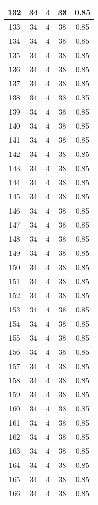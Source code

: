 \documentclass[letterpaper, 12pt]{article}
\begin{document}
\begin{longtable}{|c|c|c|c|c|}
\hline
132 & 34 & 4 & 38 & 0.85 \\
\hline
133 & 34 & 4 & 38 & 0.85 \\
\hline
134 & 34 & 4 & 38 & 0.85 \\
\hline
135 & 34 & 4 & 38 & 0.85 \\
\hline
136 & 34 & 4 & 38 & 0.85 \\
\hline
137 & 34 & 4 & 38 & 0.85 \\
\hline
138 & 34 & 4 & 38 & 0.85 \\
\hline
139 & 34 & 4 & 38 & 0.85 \\
\hline
140 & 34 & 4 & 38 & 0.85 \\
\hline
141 & 34 & 4 & 38 & 0.85 \\
\hline
142 & 34 & 4 & 38 & 0.85 \\
\hline
143 & 34 & 4 & 38 & 0.85 \\
\hline
144 & 34 & 4 & 38 & 0.85 \\
\hline
145 & 34 & 4 & 38 & 0.85 \\
\hline
146 & 34 & 4 & 38 & 0.85 \\
\hline
147 & 34 & 4 & 38 & 0.85 \\
\hline
148 & 34 & 4 & 38 & 0.85 \\
\hline
149 & 34 & 4 & 38 & 0.85 \\
\hline
150 & 34 & 4 & 38 & 0.85 \\
\hline
151 & 34 & 4 & 38 & 0.85 \\
\hline
152 & 34 & 4 & 38 & 0.85 \\
\hline
153 & 34 & 4 & 38 & 0.85 \\
\hline
154 & 34 & 4 & 38 & 0.85 \\
\hline
155 & 34 & 4 & 38 & 0.85 \\
\hline
156 & 34 & 4 & 38 & 0.85 \\
\hline
157 & 34 & 4 & 38 & 0.85 \\
\hline
158 & 34 & 4 & 38 & 0.85 \\
\hline
159 & 34 & 4 & 38 & 0.85 \\
\hline
160 & 34 & 4 & 38 & 0.85 \\
\hline
161 & 34 & 4 & 38 & 0.85 \\
\hline
162 & 34 & 4 & 38 & 0.85 \\
\hline
163 & 34 & 4 & 38 & 0.85 \\
\hline
164 & 34 & 4 & 38 & 0.85 \\
\hline
165 & 34 & 4 & 38 & 0.85 \\
\hline
166 & 34 & 4 & 38 & 0.85 \\

\end{longtable}
\end{document}
